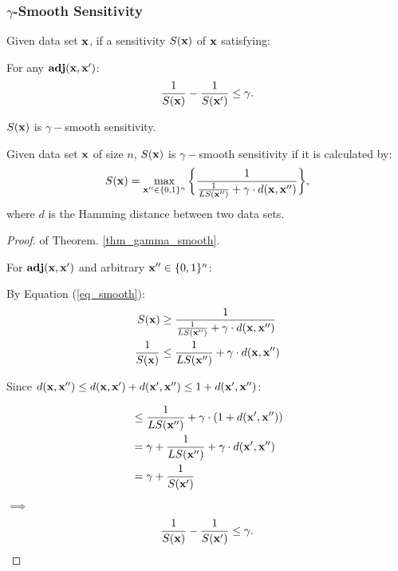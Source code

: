 \documentclass{article}
\begin{document}
\subsubsection{$\gamma$-Smooth Sensitivity}
\label{sec_mechs}

\begin{definition}
Given data set $\textbf{x}$, if a sensitivity $S(\textbf{x})$ of $\textbf{x}$ satisfying:

For any $\textbf{adj}(\textbf{x},\textbf{x}')$:
\begin{equation}
\label{eq_gamma_smooth}
\frac{1}{S(\textbf{x})} - \frac{1}{S(\textbf{x}')} \leq \gamma.
\end{equation}

$S(\textbf{x})$ is $\gamma -$smooth sensitivity.

\end{definition}


\begin{thm}
\label{thm_gamma_smooth}
Given data set $\textbf{x}$ of size $n$, $S(\textbf{x})$ is $\gamma -$smooth sensitivity if it is calculated by:
\begin{equation}
  \label{eq_smooth}
   S(\textbf{x})=\max_{\textbf{x}'' \in \{0,1\}^{n}}\bigg \{ \frac{1}{\frac{1}{LS(\textbf{x}'')} +\gamma \cdot d(\textbf{x},\textbf{x}'')} \bigg \},
\end{equation}
where $d$ is the Hamming distance between two data sets.
\end{thm}

\begin{proof}
of Theorem. \ref{thm_gamma_smooth}.

For $\textbf{adj}(\textbf{x},\textbf{x}')$ and arbitrary $\textbf{x}'' \in \{0,1\}^{n}$:

By Equation (\ref{eq_smooth}):
\begin{equation*}
\begin{split}
S(\textbf{x}) 
& \geq \frac{1}{\frac{1}{LS(\textbf{x}'')} +\gamma \cdot d(\textbf{x},\textbf{x}'')}\\
\frac{1}{S(\textbf{x})} 
& \leq \frac{1}{LS(\textbf{x}'')} +\gamma \cdot d(\textbf{x},\textbf{x}'')\\
\end{split}
\end{equation*}

Since $d(\textbf{x},\textbf{x}'') \leq d(\textbf{x},\textbf{x}') + d(\textbf{x}',\textbf{x}'') \leq 1 + d(\textbf{x}',\textbf{x}'')$:

\begin{equation*}
\begin{split}
& \leq \frac{1}{LS(\textbf{x}'')} +\gamma \cdot (1 + d(\textbf{x}',\textbf{x}''))\\
& = \gamma + \frac{1}{LS(\textbf{x}'')} +\gamma \cdot d(\textbf{x}',\textbf{x}'')\\
& = \gamma + \frac{1}{S(\textbf{x}')}
\end{split}
\end{equation*}
$\implies$
\begin{equation*}
\frac{1}{S(\textbf{x})} - \frac{1}{S(\textbf{x}')} \leq \gamma.
\end{equation*}

\end{proof}
\end{document}
